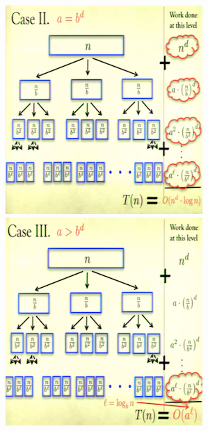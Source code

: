 \documentclass[12pt]{article}
\begin{document}
\begin{itemize}
\begin{center}
\includegraphics{lecture3t}
\includegraphics{lecture3u}
\end{center}

\end{itemize}
\end{document}
